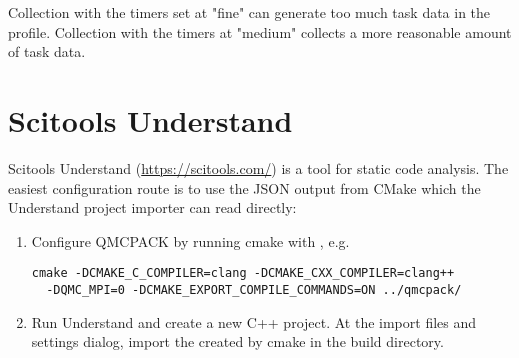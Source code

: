 Collection with the timers set at "fine" can generate too much task data in the profile.
Collection with the timers at "medium" collects a more reasonable amount of task data.

\section{Scitools Understand}

Scitools Understand (\url{https://scitools.com/}) is a tool for static
code analysis. The easiest configuration route is to use the JSON output
from CMake which the Understand project importer can read directly:
\begin{enumerate}
\item Configure QMCPACK by running cmake with
  , e.g.
  \begin{lstlisting}[style=SHELL]
  cmake -DCMAKE_C_COMPILER=clang -DCMAKE_CXX_COMPILER=clang++
  -DQMC_MPI=0 -DCMAKE_EXPORT_COMPILE_COMMANDS=ON ../qmcpack/
  \end{lstlisting}
\item Run Understand and create a new C++ project. At the import files
  and settings dialog, import the  created by
  cmake in the build directory.  
\end{enumerate}
